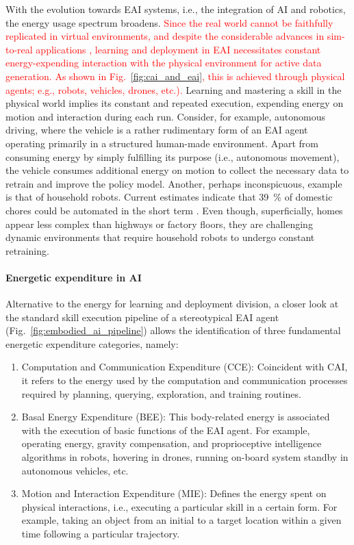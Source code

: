 \documentclass[12pt]{article}
\newcommand\myhl[1]{\textcolor{red}{#1}}
\begin{document}
With the evolution towards EAI systems, i.e., the integration of AI and robotics, the energy usage spectrum broadens. \myhl{Since the real world cannot be faithfully replicated in virtual environments, and despite the considerable advances in sim-to-real applications \cite{Chebotar2019Closingsimreal}, learning and deployment in EAI necessitates constant energy-expending interaction with the physical environment for active data generation. As shown in Fig.~\ref{fig:cai_and_eai}, this is achieved through physical agents; e.g., robots, vehicles, drones, etc.).} Learning and mastering a skill in the physical world implies its constant and repeated execution, expending energy on motion and interaction during each run. Consider, for example, autonomous driving, where the vehicle is a rather rudimentary form of an EAI agent operating primarily in a structured human-made environment. Apart from consuming energy by simply fulfilling its purpose (i.e., autonomous movement), the vehicle consumes additional energy on motion to collect the necessary data to retrain and improve the policy model. Another, perhaps inconspicuous, example is that of household robots. Current estimates indicate that 39~\%  of domestic chores could be automated in the short term \cite{Lehdonvirta2022futuresunpaidwork}. Even though, superficially, homes appear less complex than highways or factory floors, they are challenging dynamic environments that require household robots to undergo constant retraining. 

\paragraph*{Energetic expenditure in AI}
Alternative to the energy for learning and deployment division, a closer look at the standard skill execution pipeline of a stereotypical EAI agent (Fig.~\ref{fig:embodied_ai_pipeline}) allows the identification of three fundamental energetic expenditure categories, namely:
\begin{enumerate}
	\item Computation and Communication Expenditure (CCE): Coincident with CAI, it refers to the energy used by the computation and communication processes required by planning, querying, exploration, and training routines.
	\item Basal Energy Expenditure (BEE): This body-related energy is associated with the execution of basic functions of the EAI agent. For example, operating energy, gravity compensation, and proprioceptive intelligence algorithms in robots, hovering in drones, running on-board system standby in autonomous vehicles, etc.
	\item Motion and Interaction Expenditure (MIE): Defines the energy spent on physical interactions, i.e., executing a particular skill in a certain form. For example, taking an object from an initial to a target location within a given time following a particular trajectory.
\end{enumerate}
\end{document}

